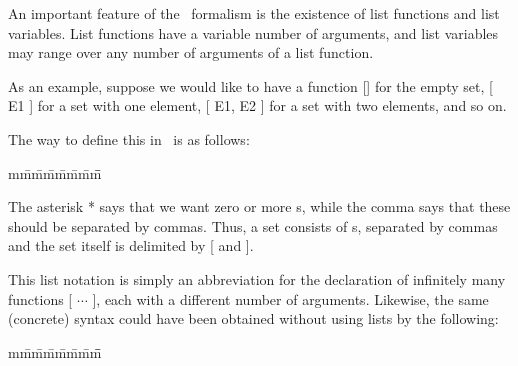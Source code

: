   An important feature of the \asdf\ formalism is the existence
  of list functions and list variables.
  List functions have a variable number of arguments,
  and list variables may range over any number of arguments of a list
  function.

  As an example, suppose we would like to have a function
  [] for the empty set, %
  [ E1 ] for a set with one element, %
  [ E1, E2 ]  for a set with two elements, %
  and so on.
  
  The way to define this in \asdf\ is as follows:
  \begin{tabbing}
  m\=m\=m\=m\=m\=m\=m\=m\=\kill
  \+\+
   \CFGBEGIN{}
  \CFGEND{}
  \end{tabbing}

  The asterisk * says that we want %
  zero or more s, %
  while the comma says that these should be separated by commas.
  Thus, a set consists of s, separated by commas
  and the set itself is delimited by [ and ]. 

  This list notation is simply an abbreviation for the declaration of
  infinitely many functions [ $\cdots$ ], %
  each with a different number of arguments.
  Likewise, the same (concrete) syntax could have been
  obtained without using lists by the following:

\begin{tabbing}
m\=m\=m\=m\=m\=m\=m\=m\=\kill
\+\+
 \CFGBEGIN{}
\CFGEND{}
\end{tabbing}


